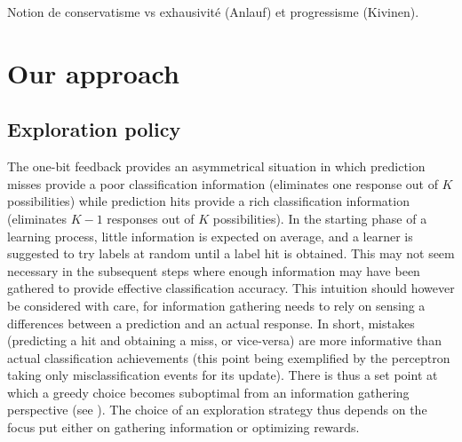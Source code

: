 \documentclass[preprint,12pt,authoryear]{elsarticle}
\begin{document}
{\color{green} Notion de conservatisme vs exhausivité (Anlauf) et progressisme (Kivinen).}












\section{Our approach}

\subsection{Exploration policy}

The one-bit feedback provides an asymmetrical situation in which prediction misses provide a poor classification information (eliminates one response out of $K$ possibilities) while prediction hits provide a rich classification information (eliminates $K-1$ responses out of $K$ possibilities). 
In the starting phase of a learning process, little information is expected on average, and a learner is suggested to try labels at random until a label hit is obtained. This may not seem necessary in the subsequent steps where enough information may have been gathered to provide effective classification accuracy. 
This intuition should however be considered with care, for information gathering needs to rely on sensing a differences between a prediction and an actual response. {\color{blue} In short, mistakes (predicting a hit and obtaining a miss, or vice-versa) are  more informative than actual classification achievements (this point being exemplified by the perceptron taking only misclassification events for its update). There is thus a set point at which a greedy choice becomes suboptimal from an information gathering perspective (see \cite{kakade2008efficient}).} The choice of an exploration strategy thus depends on the focus put either on gathering information or optimizing rewards. 
\end{document}

